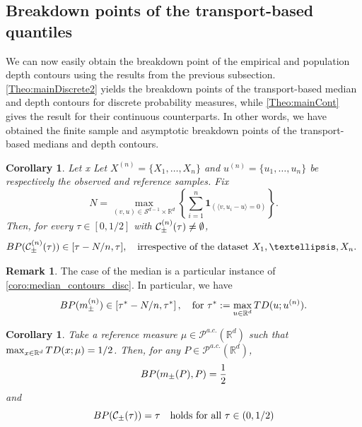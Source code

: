 \documentclass[11pt]{article}
\newcommand{\R}{\mathbb{R}}
\theoremstyle{plain}
\newtheorem{corollary}[sectioncount]{Corollary}
\theoremstyle{definition}
\newtheorem{remark}[sectioncount]{Remark}
\begin{document}
\subsection{Breakdown points of the transport-based quantiles}

We can now easily obtain the breakdown point of the empirical and population depth contours using the results from the previous subsection. \autoref{Theo:mainDiscrete2}
 yields the breakdown points of the transport-based  median and depth contours for discrete probability measures, while \autoref{Theo:mainCont} gives the result for their continuous counterparts. In other words, we have obtained the finite sample and asymptotic breakdown points of the transport-based medians and depth contours.
%
\begin{corollary}\label{coro:median_contours_disc}
Let x Let $X^{(n)}=\{X_1, \dots, X_n\}$ and  $u^{(n)}=\{u_1, \dots, u_n\}$ be respectively the observed and reference samples. Fix  {$$N=\max_{(v,u)\in \mathcal{S}^{d-1}\times \R^d}\left\{\sum_{i=1}^{n} \mathbf{1}_{\left( \langle v, u_i - u \rangle = 0 \right)} \right\}.$$}  { Then, for every $\tau\in [0,1/2]$ with  ${\cal  C}_\pm^{(n)}(\tau)\neq \emptyset$, 
 $$ {\rm BP}({\cal  C}_\pm^{(n)}(\tau) )\in [\tau-N/n,\tau], \quad  \text{irrespective of the dataset $X_1, \dots, X_n$.  } $$ }
 \end{corollary}
 \begin{remark}
      {
The case of the median is a particular instance of \autoref{coro:median_contours_disc}. In particular, we have 
  $$ {\rm BP}(m_\pm^{(n)})\in \left[\tau^*-N/n,\tau^*\right], \quad \text{for } 
\tau^*:=\max_{u\in \R^d} {\rm TD}( u; u^{(n)}).  $$ 
}
 \end{remark}
 
%
%
\begin{corollary}\label{coro:median_contours_cont}
%
Take a reference measure $\mu\in \mathcal{P}^{a.c.}(\R^d)$ such that $\max_{x\in \R^d} {\rm TD}( x; \mu) =1/2$. Then, for any  $P\in \mathcal{P}^{a.c.}(\R^d)$, 
    $${\rm BP}({m
}_\pm({P}), P)=\frac{1}{2} $$ 
and
 $$ {\rm BP}({\cal  C}_\pm(\tau) ) =\tau \quad \text{holds for all $\tau\in (0, 1/2 )$} $$
\end{corollary}
\end{document}
